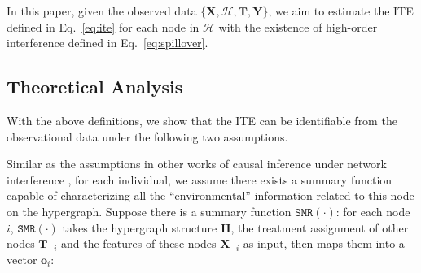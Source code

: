 In this paper, given the observed data $\{\mathbf{X}, \mathcal{H}, \mathbf{T}, \mathbf{Y}\}$, we aim to estimate the ITE defined in Eq.~\ref{eq:ite} for each node in $\mathcal{H}$ with the existence of high-order interference defined in Eq.~\ref{eq:spillover}.

\subsection{Theoretical Analysis}
With the above definitions, we show that the ITE can be identifiable from the observational data under the following two assumptions.

Similar as the assumptions in other works of causal inference under network interference \cite{ma2021causal}, for each individual, we assume there exists a summary function capable of characterizing all the ``environmental'' information related to this node on the hypergraph.
Suppose there is a summary function $\mathtt{SMR}(\cdot)$: for each node $i$, $\mathtt{SMR}(\cdot)$ takes the hypergraph structure $\mathbf{H}$, the treatment assignment of other nodes $\mathbf{T}_{-i}$ and the features of these nodes $\mathbf{X}_{-i}$ as input, then maps them into a vector $\mathbf{o}_i$: 
